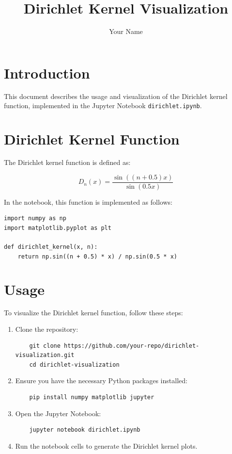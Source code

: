 \documentclass{article}
\title{Dirichlet Kernel Visualization}
\author{Your Name}
\begin{document}
\maketitle

\section{Introduction}

This document describes the usage and visualization of the Dirichlet kernel function, implemented in the Jupyter Notebook \texttt{dirichlet.ipynb}.

\section{Dirichlet Kernel Function}

The Dirichlet kernel function is defined as:

\[
D_n(x) = \frac{\sin((n + 0.5)x)}{\sin(0.5x)}
\]

In the notebook, this function is implemented as follows:

\begin{verbatim}
import numpy as np
import matplotlib.pyplot as plt

def dirichlet_kernel(x, n):
    return np.sin((n + 0.5) * x) / np.sin(0.5 * x)
\end{verbatim}

\section{Usage}

To visualize the Dirichlet kernel function, follow these steps:

\begin{enumerate}
    \item Clone the repository:
    \begin{verbatim}
    git clone https://github.com/your-repo/dirichlet-visualization.git
    cd dirichlet-visualization
    \end{verbatim}

    \item Ensure you have the necessary Python packages installed:
    \begin{verbatim}
    pip install numpy matplotlib jupyter
    \end{verbatim}

    \item Open the Jupyter Notebook:
    \begin{verbatim}
    jupyter notebook dirichlet.ipynb
    \end{verbatim}

    \item Run the notebook cells to generate the Dirichlet kernel plots.
\end{enumerate}
\end{document}

